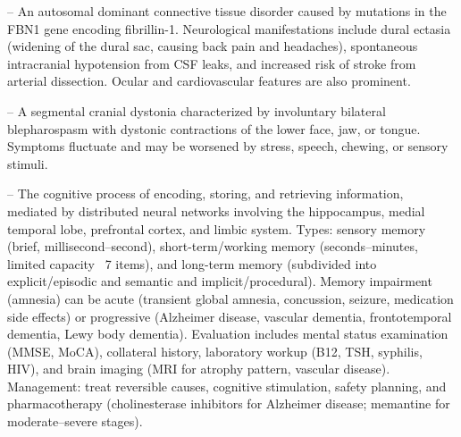 -- An autosomal dominant connective tissue disorder caused by mutations in the FBN1 gene encoding fibrillin-1. Neurological manifestations include dural ectasia (widening of the dural sac, causing back pain and headaches), spontaneous intracranial hypotension from CSF leaks, and increased risk of stroke from arterial dissection. Ocular and cardiovascular features are also prominent.

-- A segmental cranial dystonia characterized by involuntary bilateral blepharospasm with dystonic contractions of the lower face, jaw, or tongue. Symptoms fluctuate and may be worsened by stress, speech, chewing, or sensory stimuli.

-- The cognitive process of encoding, storing, and retrieving information, mediated by distributed neural networks involving the hippocampus, medial temporal lobe, prefrontal cortex, and limbic system. Types: sensory memory (brief, millisecond--second), short-term/working memory (seconds--minutes, limited capacity ~7 items), and long-term memory (subdivided into explicit/episodic and semantic and implicit/procedural). Memory impairment (amnesia) can be acute (transient global amnesia, concussion, seizure, medication side effects) or progressive (Alzheimer disease, vascular dementia, frontotemporal dementia, Lewy body dementia). Evaluation includes mental status examination (MMSE, MoCA), collateral history, laboratory workup (B12, TSH, syphilis, HIV), and brain imaging (MRI for atrophy pattern, vascular disease). Management: treat reversible causes, cognitive stimulation, safety planning, and pharmacotherapy (cholinesterase inhibitors for Alzheimer disease; memantine for moderate--severe stages).

